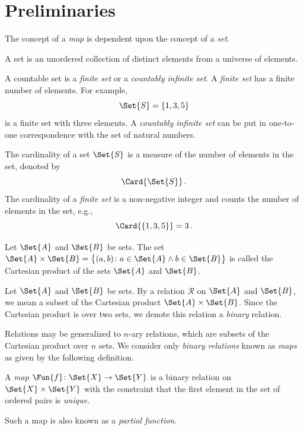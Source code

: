 \documentclass[ ../main.tex]{subfiles}
\begin{document}
\section{Preliminaries}
\label{sec:prelim}
The concept of a \emph{map} is dependent upon the concept of a \emph{set}.
\begin{definition}
	A set is an unordered collection of distinct elements from a universe of elements.
\end{definition}

A countable set is a \emph{finite set} or a \emph{countably infinite set}. A \emph{finite set} has a finite number of elements. For example,
\[
\Set{S} = \{ 1, 3, 5 \}
\]
is a finite set with three elements. A \emph{countably infinite set} can be put in one-to-one correspondence with the set of natural numbers.

The cardinality of a set $\Set{S}$ is a measure of the number of elements in the set, denoted by
\begin{equation}
\Card{\Set{S}}\,.
\end{equation}
The cardinality of a \emph{finite set} is a non-negative integer and counts the number of elements in the set, e.g.,
\[
\Card{\left\{ 1, 3, 5\right\}} = 3\,.
\]

\begin{definition}
	Let $\Set{A}$ and $\Set{B}$ be sets. The set $\Set{A} \times \Set{B}= \left\{(a, b) \colon a \in \Set{A} \land b \in \Set{B}\right\}$ is called the Cartesian product of the sets $\Set{A}$ and $\Set{B}$.
\end{definition}

\begin{definition}
	Let $\Set{A}$ and $\Set{B}$ be sets. By a relation $\mathcal{R}$ on $\Set{A}$ and $\Set{B}$, we mean a subset of the Cartesian product $\Set{A} \times \Set{B}$. Since the Cartesian product is over two sets, we denote this relation a \emph{binary} relation.
\end{definition}
Relations may be generalized to $n$-ary relations, which are subsets of the Cartesian product over $n$ sets. We consider only \emph{binary relations} known as \emph{maps} as given by the following definition.
\begin{definition}[Map]
\label{def:map}
	A \emph{map} $\Fun{f} \colon \Set{X} \to \Set{Y}$ is a binary relation on $\Set{X} \times \Set{Y}$ with the constraint that the first element in the set of ordered pairs is \emph{unique}.
\end{definition}
Such a map is also known as a \emph{partial function}.
\end{document}
